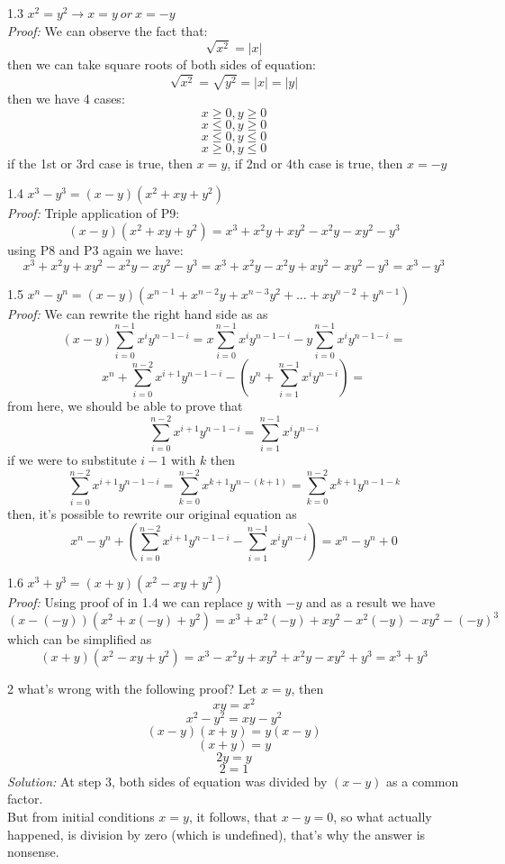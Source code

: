 \documentclass[a4paper, 11pt]{article}
\begin{document}
\hrulefill

1.3 $x^2 = y^2 \rightarrow x = y \ or \ x = -y$\\
\emph{Proof:}
We can observe the fact that:
$$\sqrt{x^2} = |x|$$
then we can take square roots of both sides of equation:
$$\sqrt{x^2} = \sqrt{y^2} = |x| = |y|$$
then we have 4 cases:
$$x \geq 0, y \geq 0$$
$$x \leq 0, y \geq 0$$
$$x \leq 0, y \leq 0$$
$$x \geq 0, y \leq 0$$
if the 1st or 3rd case is true, then $x = y$, if 2nd or 4th case is true, then $x = - y$ 

\hrulefill

1.4 $x^3 - y^3 = (x - y)(x^2 + xy + y^2)$\\
\emph{Proof:}
Triple application of P9:
$$(x - y)(x^2 + xy + y^2) = x^3 + x^2y + xy^2 - x^2y - xy^2 - y^3$$
using P8 and P3 again we have:
$$x^3 + x^2y + xy^2 - x^2y - xy^2 - y^3 = x^3 + x^2y - x^2y + xy^2 - xy^2 - y^3 = x^3 - y^3$$ 

\hrulefill

1.5 $x^n - y^n = (x - y)(x^{n-1} + x^{n-2}y + x^{n-3}y^2 + \ldots + xy^{n-2} + y^{n-1})$\\
\emph{Proof:} 
We can rewrite the right hand side as as
$$(x - y) \sum_{i=0}^{n-1}x^iy^{n-1-i} = x\sum_{i=0}^{n-1}x^iy^{n-1-i} - y\sum_{i=0}^{n-1}x^iy^{n-1-i} = $$
$$x^n + \sum_{i=0}^{n-2}x^{i+1}y^{n-1-i} - (y^n + \sum_{i=1}^{n-1}x^iy^{n-i}) = $$
from here, we should be able to prove that
$$\sum_{i=0}^{n-2}x^{i+1}y^{n-1-i} = \sum_{i=1}^{n-1}x^iy^{n-i}$$
if we were to substitute $i - 1$ with $k$ then
$$\sum_{i=0}^{n-2}x^{i+1}y^{n-1-i} = \sum_{k=0}^{n-2}x^{k+1}y^{n-(k+1)} = \sum_{k=0}^{n-2}x^{k+1}y^{n-1-k}$$
then, it's possible to rewrite our original equation as
$$x^n - y^n + (\sum_{i=0}^{n-2}x^{i+1}y^{n-1-i} - \sum_{i=1}^{n-1}x^iy^{n-i} ) = x^n - y^n + 0$$

\hrulefill

1.6 $x^3 + y^3 = (x + y)(x^2 - xy + y^2)$\\
\emph{Proof:} 
Using proof of in 1.4 we can replace $y$ with $-y$ and as a result we have
$$(x - (-y))(x^2 + x(-y) + y^2) = x^3 + x^2(-y) + xy^2 - x^2(-y) - xy^2 - (-y)^3$$
which can be simplified as
$$(x + y)(x^2 - xy + y^2) = x^3 - x^2y + xy^2 + x^2y - xy^2 + y^3 = x^3 + y^3$$

\hrulefill

2 what's wrong with the following proof? Let $x = y$, then
$$xy = x^2$$
$$x^2 - y^2 = xy - y^2$$
$$(x - y)(x + y) = y(x - y)$$
$$(x + y) = y$$
$$2y = y$$
$$2 = 1$$
\emph{Solution:}
At step 3, both sides of equation was divided by $(x - y)$ as a common factor.\\
But from initial conditions $x = y$, it follows, that $x - y = 0$, so what
actually happened, is division by zero (which is undefined), that's why the answer is nonsense.
\end{document}
